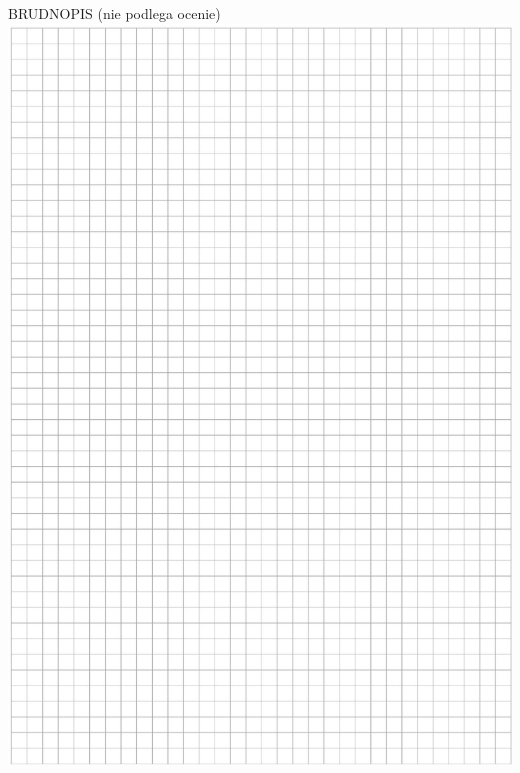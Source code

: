 \documentclass[10pt]{article}
\begin{document}
BRUDNOPIS (nie podlega ocenie)\\
\includegraphics[max width=\textwidth, center]{2024_11_21_daeb5e5efb43dd4cb535g-29}\\
\end{document}
